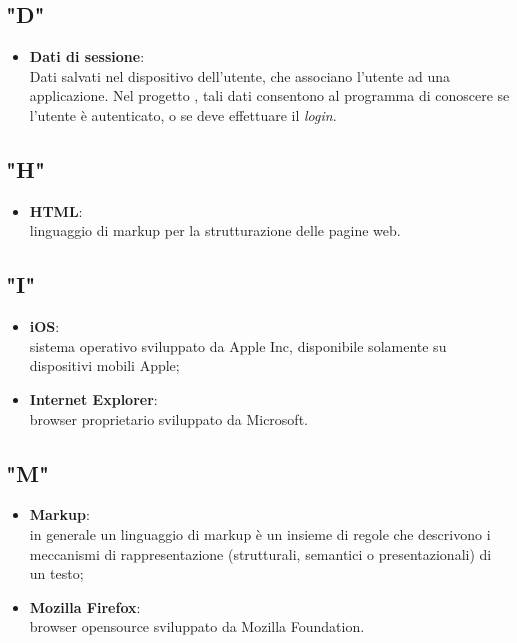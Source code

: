 \subsection*{"D"}
\begin{itemize}
\item \textbf{Dati di sessione}:\\ Dati salvati nel dispositivo dell'utente, che associano l'utente ad una applicazione. Nel progetto \progetto{}, tali dati consentono al programma di conoscere se l'utente è autenticato, o se deve effettuare il \textit{login}.
\end{itemize}

\subsection*{"H"}
\begin{itemize}
\item \textbf{HTML}:\\ linguaggio di markup per la strutturazione delle pagine web.
\end{itemize}

\subsection*{"I"}
\begin{itemize}
\item \textbf{iOS}:\\ sistema operativo sviluppato da Apple Inc, disponibile solamente su dispositivi mobili Apple;
\item \textbf{Internet Explorer}:\\ browser proprietario sviluppato da Microsoft.
\end{itemize}

\subsection*{"M"}
\begin{itemize}
\item \textbf{Markup}:\\ in generale un linguaggio di markup è un insieme di regole che descrivono i meccanismi di rappresentazione (strutturali, semantici o presentazionali) di un testo;
\item \textbf{Mozilla Firefox}:\\ browser opensource sviluppato da Mozilla Foundation.
\end{itemize}

